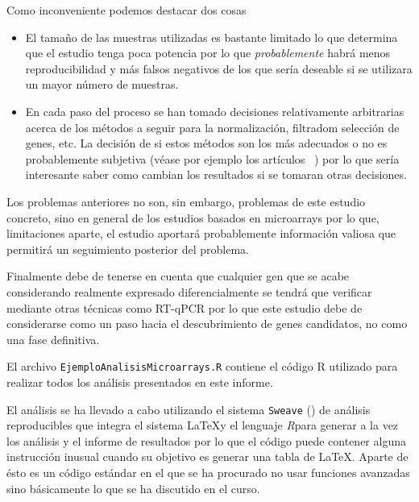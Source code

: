 \documentclass[a4paper]{article}\usepackage[]{graphicx}\usepackage[]{color}
\newcommand{\R}{{\it R}}
\begin{document}
Como inconveniente podemos destacar dos cosas
\begin{itemize}
\item El tamaño de las muestras utilizadas es bastante limitado lo que determina que el estudio tenga poca potencia por lo que \emph{probablemente} habrá menos reproducibilidad y más falsos negativos de los que sería deseable si se utilizara un mayor número de muestras.
\item En cada paso del proceso se han tomado decisiones relativamente arbitrarias acerca de los métodos a seguir para la normalización, filtradom selección de genes, etc. La decisión de si estos métodos son los más adecuados o no es probablemente subjetiva (véase por ejemplo los artículos ~\cite{Choe:2005, Zhu:2010}) por lo que sería interesante saber como cambian los resultados si se tomaran otras decisiones.
\end{itemize}

Los problemas anteriores no son, sin embargo, problemas de este estudio concreto, sino en general de los estudios basados en microarrays por lo que, limitaciones aparte, el estudio aportará probablemente información valiosa que permitirá un seguimiento posterior del problema.

Finalmente debe de tenerse en cuenta que cualquier gen que se acabe considerando realmente expresado diferencialmente se tendrá que verificar mediante otras técnicas como RT-qPCR por lo que este estudio debe de considerarse como un paso hacia el descubrimiento de genes candidatos, no como una fase definitiva.






El archivo \texttt{EjemploAnalisisMicroarrays.R} contiene el código R utilizado para realizar todos los análisis presentados en este informe.

El análisis se ha llevado a cabo utilizando el sistema \texttt{Sweave} (\cite{Leisch:2002a, Leisch:2002b}) de análisis reproducibles que integra el sistema \LaTeX y el lenguaje \R para generar a la vez los análisis y el informe de resultados por lo que el código puede contener alguna instrucción inusual cuando su objetivo es generar una tabla de \LaTeX. Aparte de ésto es un código estándar en el que se ha procurado no usar funciones avanzadas sino básicamente lo que se ha discutido en el curso.
\end{document}
